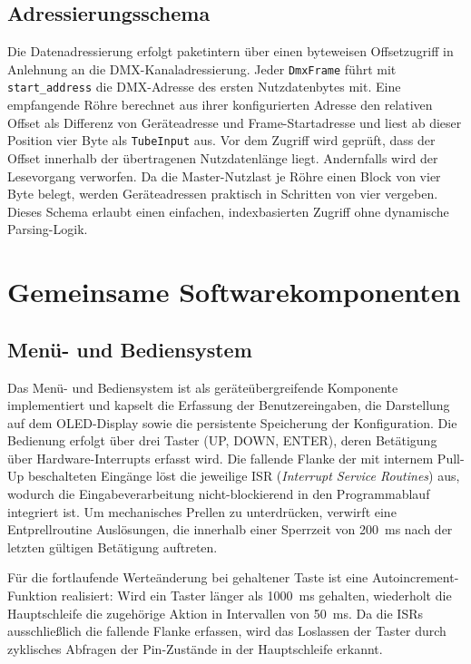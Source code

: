 \subsection{Adressierungsschema}
\label{subsec:adressierung}

Die Datenadressierung erfolgt paketintern über einen byteweisen
Offsetzugriff in Anlehnung an die DMX-Kanaladressierung. Jeder
\texttt{DmxFrame} führt mit \texttt{start\_address} die DMX-Adresse des
ersten Nutzdatenbytes mit. Eine empfangende Röhre berechnet aus ihrer
konfigurierten Adresse den relativen Offset als Differenz von
Geräteadresse und Frame-Startadresse und liest ab dieser Position vier
Byte als \texttt{TubeInput} aus. Vor dem Zugriff wird geprüft, dass der
Offset innerhalb der übertragenen Nutzdatenlänge liegt. Andernfalls wird
der Lesevorgang verworfen. Da die Master-Nutzlast je Röhre einen Block
von vier Byte belegt, werden Geräteadressen praktisch in Schritten von
vier vergeben. Dieses Schema erlaubt einen einfachen, indexbasierten
Zugriff ohne dynamische Parsing-Logik.


\section{Gemeinsame Softwarekomponenten}
\label{sec:gemeinsame-komponenten}

\subsection{Menü- und Bediensystem}
\label{subsec:menu}

Das Menü- und Bediensystem ist als geräteübergreifende Komponente
implementiert und kapselt die Erfassung der Benutzereingaben, die
Darstellung auf dem OLED-Display sowie die persistente Speicherung der
Konfiguration. Die Bedienung erfolgt über drei Taster (UP, DOWN,
ENTER), deren Betätigung über Hardware-Interrupts erfasst wird. 
Die fallende Flanke der mit internem Pull-Up beschalteten Eingänge 
löst die jeweilige ISR (\textit{Interrupt Service Routines}) aus, wodurch die
Eingabeverarbeitung nicht-blockierend in den Programmablauf integriert
ist. Um mechanisches Prellen zu unterdrücken, verwirft eine
Entprellroutine Auslösungen, die innerhalb einer Sperrzeit von 200~ms
nach der letzten gültigen Betätigung auftreten.

Für die fortlaufende Werteänderung bei gehaltener Taste ist eine
Autoincrement-Funktion realisiert: Wird ein Taster länger als 1000~ms
gehalten, wiederholt die Hauptschleife die zugehörige Aktion in
Intervallen von 50~ms. Da die ISRs ausschließlich die fallende Flanke
erfassen, wird das Loslassen der Taster durch zyklisches Abfragen der
Pin-Zustände in der Hauptschleife erkannt.

